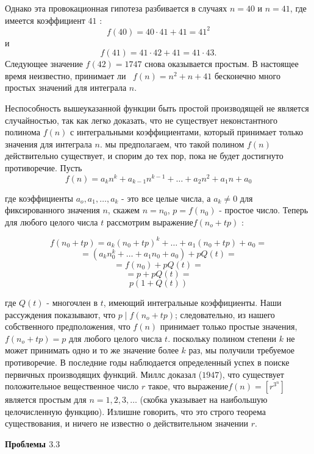 \documentclass[11pt]{article}
\begin{document}
Однако эта провокационная гипотеза разбивается в случаях $n = 40$ и $n = 41$, где имеется коэффициент $41$ :
\[
f(40) = 40 \cdot 41 + 41 = 41^2
\]
и
\[
f (41) = 41 \cdot 42 + 41 = 41 \cdot 43.
\]
Следующее значение $f(42) = 1747$ снова оказывается простым. В настоящее время неизвестно, принимает ли ~$f(n) = n^2+ n + 41$ бесконечно много простых значений для интеграла $n$.

Неспособность вышеуказанной функции быть простой производящей не является случайностью, так как легко доказать, что не существует неконстантного полинома $f(n)$ с интегральными коэффициентами, который принимает только значения для интеграла $n$. мы предполагаем, что такой полином $f(n)$ действительно существует, и спорим до тех пор, пока не будет достигнуто противоречие. Пусть 
\[
f(n)=a_kn^k+a_{k-1}n^{k-1}+\ldots+a_2n^2+a_1n+a_0
\]

где коэффициенты $a_o, a_1,\ldots, a_k$ - это все целые числа, а $a_k \ne 0$ для фиксированного значения $n$, скажем $n = n_0$, $ p=f(n_0)$ - простое число. Теперь для любого целого числа $t$ рассмотрим выражение$ f(n_o+tp)$ :

\[
f(n_0+tp)=a_k(n_0+tp)^k+\ldots+a_1(n_0+tp)+a_0=
\]
\[
=(a_kn_0^{k}+\ldots+a_1n_0+a_0)+pQ(t)= 
\]
\[
=f(n_0)+pQ(t)=
\]
\[
=p+pQ(t)=
\]
\[
p(1+Q(t))
\]

где $Q(t)$ - многочлен в $t$, имеющий интегральные коэффициенты. Наши рассуждения показывают, что $p\mid f(n_o + tp)$; следовательно, из нашего собственного предположения, что $f(n)$ принимает только простые значения, $f(n_o+tp) =p$ для любого целого числа $t$. поскольку полином степени $k$ не может принимать одно и то же значение более $k$ раз, мы получили требуемое противоречие.
В последние годы наблюдается определенный успех в поиске первичных производящих функций. Миллс доказал ($1947$), что существует положительное вещественное число $r$ такое, что выражение$f(n) = [r^{3^n}]$ является простым для $n = 1, 2, 3,\ldots$ (скобка указывает на наибольшую целочисленную функцию). Излишне говорить, что это строго теорема существования, и ничего не известно о действительном значении $r$.

\begin{center}
\textbf{\large{Проблемы $3.3$}}
\end{center}
\end{document}
